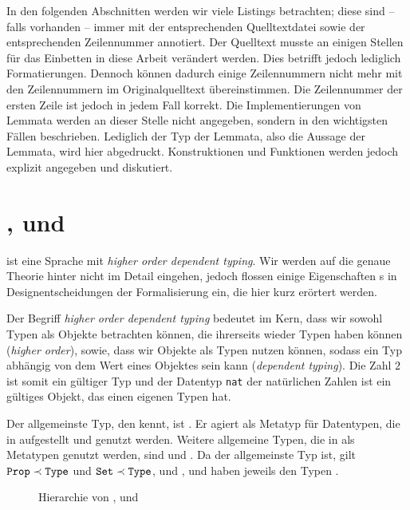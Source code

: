 In den folgenden Abschnitten werden wir viele Listings betrachten; diese sind -- falls vorhanden -- immer mit der entsprechenden Quelltextdatei sowie der entsprechenden Zeilennummer annotiert. Der Quelltext musste an einigen Stellen für das Einbetten in diese Arbeit verändert werden. Dies betrifft jedoch lediglich Formatierungen. Dennoch können dadurch einige Zeilennummern nicht mehr mit den Zeilennummern im Originalquelltext übereinstimmen. Die Zeilennummer der ersten Zeile ist jedoch in jedem Fall korrekt. Die Implementierungen von Lemmata werden an dieser Stelle nicht angegeben, sondern in den wichtigsten Fällen beschrieben. Lediglich der Typ der Lemmata, also die Aussage der Lemmata, wird hier abgedruckt. Konstruktionen und Funktionen werden jedoch explizit angegeben und diskutiert.

\section{\Type, \Prop{} und \Set}
\coq{} ist eine Sprache mit \emph{higher order dependent typing}. Wir werden auf die genaue Theorie hinter \coq{} nicht im Detail eingehen, jedoch flossen einige Eigenschaften \coq s in Designentscheidungen der Formalisierung ein, die hier kurz erörtert werden.

Der Begriff \emph{higher order dependent typing} bedeutet im Kern, dass wir sowohl Typen als Objekte betrachten können, die ihrerseits wieder Typen haben können (\emph{higher order}), sowie, dass wir Objekte als Typen nutzen können, sodass ein Typ abhängig von dem Wert eines Objektes sein kann (\emph{dependent typing}). Die Zahl $2$ ist somit ein gültiger Typ und der Datentyp \texttt{nat} der natürlichen Zahlen ist ein gültiges Objekt, das einen eigenen Typen hat.
  
Der allgemeinste Typ, den \coq{} kennt, ist \Type{}. Er agiert als Metatyp für Datentypen, die in \coq{} aufgestellt und genutzt werden. Weitere allgemeine Typen, die in \coq{} als Metatypen genutzt werden, sind \Prop{} und \Set. Da \Type{} der allgemeinste Typ ist, gilt $\texttt{Prop}\prec\texttt{Type}$ und $\texttt{Set}\prec\texttt{Type}$, und \Prop{}, \Set{} und \Type{} haben jeweils den Typen \Type. 
\begin{figure}[t]
    \begin{center}
    \end{center}
    \caption{Hierarchie von \Type, \Prop{} und \Set}
    \label{fig:TypePropSet}
\end{figure}
\begin{icode}
\end{icode}

